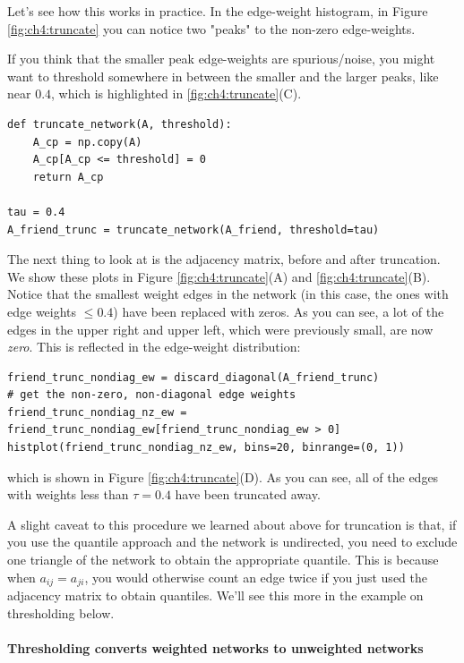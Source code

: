 Let's see how this works in practice. In the edge-weight histogram, in Figure \ref{fig:ch4:truncate} you can notice two "peaks" to the non-zero edge-weights.

If you think that the smaller peak edge-weights are spurious/noise, you might want to threshold somewhere in between the smaller and the larger peaks, like near $0.4$, which is highlighted in \ref{fig:ch4:truncate}(C). 

\begin{lstlisting}[style=python]
def truncate_network(A, threshold):
    A_cp = np.copy(A)
    A_cp[A_cp <= threshold] = 0
    return A_cp

tau = 0.4
A_friend_trunc = truncate_network(A_friend, threshold=tau)
\end{lstlisting}
The next thing to look at is the adjacency matrix, before and after truncation. We show these plots in Figure \ref{fig:ch4:truncate}(A) and \ref{fig:ch4:truncate}(B). Notice that the smallest weight edges in the network (in this case, the ones with edge weights $\leq 0.4$) have been replaced with zeros. As you can see, a lot of the edges in the upper right and upper left, which were previously small, are now \emph{zero}. This is reflected in the edge-weight distribution:

\begin{lstlisting}[style=python]
friend_trunc_nondiag_ew = discard_diagonal(A_friend_trunc)
# get the non-zero, non-diagonal edge weights
friend_trunc_nondiag_nz_ew = friend_trunc_nondiag_ew[friend_trunc_nondiag_ew > 0]
histplot(friend_trunc_nondiag_nz_ew, bins=20, binrange=(0, 1))
\end{lstlisting}
which is shown in Figure \ref{fig:ch4:truncate}(D). As you can see, all of the edges with weights less than $\tau = 0.4$ have been truncated away.

A slight caveat to this procedure we learned about above for truncation is that, if you use the quantile approach and the network is undirected, you need to exclude one triangle of the network to obtain the appropriate quantile. This is because when $a_{ij} = a_{ji}$, you would otherwise count an edge twice if you just used the adjacency matrix to obtain quantiles. We'll see this more in the example on thresholding below.


\paragraph{Thresholding converts weighted networks to unweighted networks}
\label{sec:ch4:regularization:thresholding}

